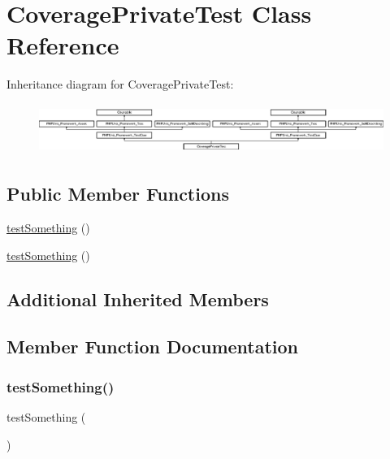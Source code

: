 \hypertarget{class_coverage_private_test}{}\section{Coverage\+Private\+Test Class Reference}
\label{class_coverage_private_test}
Inheritance diagram for Coverage\+Private\+Test\+:\begin{figure}[H]
\begin{center}
\leavevmode
\includegraphics[height=1.651917cm]{class_coverage_private_test}
\end{center}
\end{figure}
\subsection*{Public Member Functions}
\begin{DoxyCompactItemize}
\item 
\mbox{\hyperlink{class_coverage_private_test_a0fc4e17369bc9607ebdd850d9eda8167}{test\+Something}} ()
\item 
\mbox{\hyperlink{class_coverage_private_test_a0fc4e17369bc9607ebdd850d9eda8167}{test\+Something}} ()
\end{DoxyCompactItemize}
\subsection*{Additional Inherited Members}


\subsection{Member Function Documentation}
\mbox{\label{class_coverage_private_test_a0fc4e17369bc9607ebdd850d9eda8167}} 
\subsubsection{\texorpdfstring{test\+Something()}{testSomething()}\hspace{0.1cm}{\footnotesize\ttfamily [1/2]}}
{\footnotesize\ttfamily test\+Something (\begin{DoxyParamCaption}{ }\end{DoxyParamCaption})}

